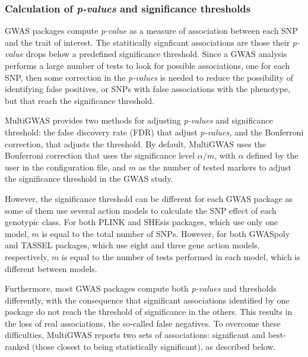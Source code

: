 \documentclass{article}
\begin{document}


\subsubsection{Calculation of \emph{p-values }and significance thresholds}

GWAS packages compute \emph{p-value }as a measure of association between each SNP and the trait of interest. The statitically signficant associations are those their \emph{p-value }drops below a predefined significance threshold. Since a GWAS analysis performs a large number of tests to look for possible associations, one for each SNP, then some correction in the \emph{p-values} is needed to reduce the possibility of identifying false positives, or SNPs with false associations with the phenotype, but that reach the significance threshold.

MultiGWAS provides two methods for adjusting \emph{p-values} and significance threshold: the false discovery rate (FDR) that adjust \emph{p-values, }and the Bonferroni correction, that adjusts the threshold. By default, MultiGWAS uses the Bonferroni correction that uses the significance level $\alpha/m$, with $\alpha$ defined by the user in the configuration file, and $m$ as the number of tested markers to adjust the significance threshold in the GWAS study. 

However, the significance threshold can be different for each GWAS package as some of them use several action models to calculate the SNP effect of each genotypic class. For both PLINK and SHEsis packages, which use only one model, $m$ is equal to the total number of SNPs. However, for both GWASpoly and TASSEL packages, which use eight and three gene action models, respectively, $m$ is equal to the number of tests performed in each model, which is different between models.

Furthermore, most GWAS packages compute both \emph{p-values} and thresholds differently, with the consequence that significant associations identified by one package do not reach the threshold of significance in the others. This results in the loss of real associations, the so-called false negatives. To overcome these difficulties, MultiGWAS reports two sets of associations: significant and best-ranked (those closest to being statistically significant), as described below.

\end{document}

